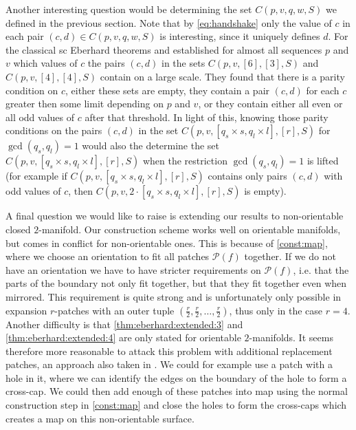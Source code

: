 Another interesting question would be determining the set $C(p, v, q, w, S)$ we defined in the previous section. Note that by \eqref{eq:handshake} only the value of $c$ in each pair $(c, d) \in C(p, v, q, w, S)$ is interesting, since it uniquely defines $d$. For the classical {sc Eberhard} theorems \cite{jendrol1993face} and \cite{jucovivc1976face} established for almost all sequences $p$ and $v$ which values of $c$ the pairs $(c, d)$ in the sets $C(p, v, [6], [3], S)$ and $C(p, v, [4], [4], S)$ contain on a large scale. They found that there is a parity condition on $c$, either these sets are empty, they contain a pair $(c, d)$ for each $c$ greater then some limit depending on $p$ and $v$, or they contain either all even or all odd values of $c$ after that threshold. In light of this, knowing those parity conditions on the pairs $(c, d)$ in the set $C(p, v, [q_s \times s, q_l \times l], [r], S)$ for $\gcd(q_s, q_l) = 1$ would also the determine the set $C(p, v, [q_s \times s, q_l \times l], [r], S)$ when the restriction $\gcd(q_s, q_l) = 1$ is lifted (for example if $C(p, v, [q_s \times s, q_l \times l], [r], S)$ contains only pairs $(c, d)$ with odd values of $c$, then $C(p, v, 2 \cdot [q_s \times s, q_l \times l], [r], S)$ is empty).

A final question we would like to raise is extending our results to non-orientable closed $2$-manifold. Our construction scheme works well on orientable manifolds, but comes in conflict for non-orientable ones. This is because of \autoref{const:map}, where we choose an orientation to fit all patches $\mathcal{P}(f)$ together. If we do not have an orientation we have to have stricter requirements on $\mathcal{P}(f)$, i.e. that the parts of the boundary not only fit together, but that they fit together even when mirrored. This requirement is quite strong and is unfortunately only possible in expansion $r$-patches with an outer tuple $(\frac{r}{2}, \frac{r}{2}, \dots, \frac{r}{2})$, thus only in the case $r = 4$. Another difficulty is that \autoref{thm:eberhard:extended:3} and \autoref{thm:eberhard:extended:4} are only stated for orientable $2$-manifolds. It seems therefore more reasonable to attack this problem with additional replacement patches, an approach also taken in \cite{devos2010eberhard}. We could for example use a patch with a hole in it, where we can identify the edges on the boundary of the hole to form a cross-cap. We could then add enough of these patches into map using the normal construction step in \autoref{const:map} and close the holes to form the cross-caps which creates a map on this non-orientable surface.

